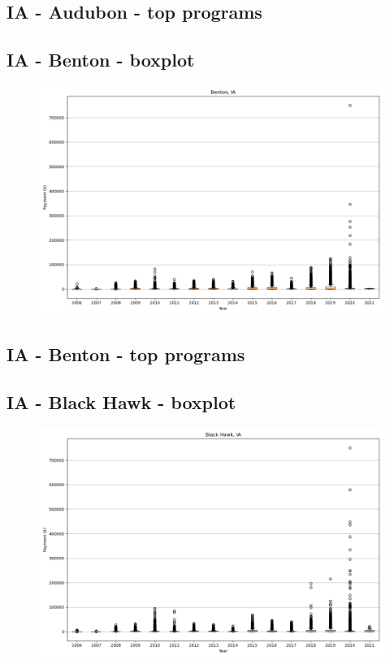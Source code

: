 \subsection*{IA - Audubon - top programs}

\newpage
\subsection*{IA - Benton - boxplot}
\begin{figure}[h]
\centering
\includegraphics[width=7in]{../output/boxplots/counties/Benton-IA_boxplot.png}
\end{figure}


\subsection*{IA - Benton - top programs}

\newpage
\subsection*{IA - Black Hawk - boxplot}
\begin{figure}[h]
\centering
\includegraphics[width=7in]{../output/boxplots/counties/Black Hawk-IA_boxplot.png}
\end{figure}


